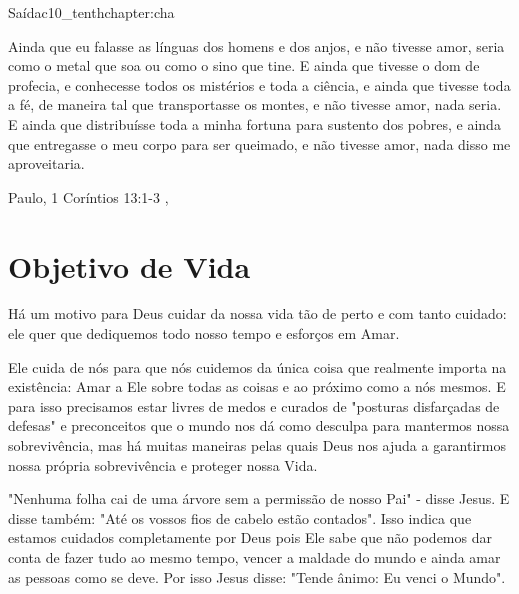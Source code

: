 \begin{chapterpage}{Saída}{c10_tenthchapter:cha}

\begin{myquotation} Ainda que eu falasse as línguas dos homens e dos anjos, e não tivesse amor, seria como o metal que soa ou como o sino que tine.
E ainda que tivesse o dom de profecia, e conhecesse todos os mistérios e toda a ciência, e ainda que tivesse toda a fé, de maneira tal que transportasse os montes, e não tivesse amor, nada seria.
E ainda que distribuísse toda a minha fortuna para sustento dos pobres, e ainda que entregasse o meu corpo para ser queimado, e não tivesse amor, nada disso me aproveitaria.

\par\vspace*{15mm}
\mbox{}\hfill \emdash{}Paulo, 1 Coríntios 13:1-3 
, %
\par\end{myquotation}

\end{chapterpage}



\section{Objetivo de Vida}\label{c1_basicformatting:sec}

\emdash{}Há um motivo para Deus cuidar da nossa vida tão de perto e com tanto cuidado: ele quer que dediquemos todo nosso tempo e esforços em Amar.

\emdash{}Ele cuida de nós para que nós cuidemos da única coisa que realmente importa na existência: Amar a Ele sobre todas as coisas e ao próximo como a nós mesmos. E para isso precisamos estar livres de medos e curados de "posturas disfarçadas de defesas" e preconceitos que o mundo nos dá como desculpa para mantermos nossa sobrevivência, mas há muitas maneiras pelas quais Deus nos ajuda a garantirmos nossa própria sobrevivência e proteger nossa Vida.

\emdash{}"Nenhuma folha cai de uma árvore sem a permissão de nosso Pai" - disse Jesus. E disse também: "Até os vossos fios de cabelo estão contados". Isso indica que estamos cuidados completamente por Deus pois Ele sabe que não podemos dar conta de fazer tudo ao mesmo tempo, vencer a maldade do mundo e ainda amar as pessoas como se deve. Por isso Jesus disse: "Tende ânimo: Eu venci o Mundo".

